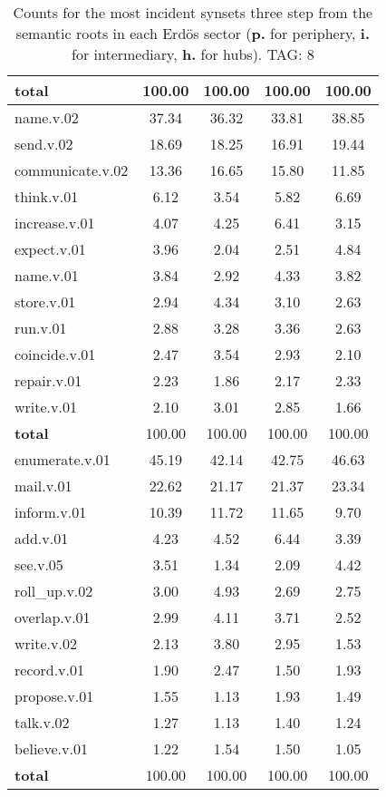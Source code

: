\begin{table}[h!]
\begin{center}
\begin{tabular}{| l || c | c | c | c |}
{{\bf total}} & 100.00  & 100.00  & 100.00  & 100.00 \\\hline\hline\hline
name.v.02 & 37.34  & 36.32  & 33.81  & 38.85 \\\hline
send.v.02 & 18.69  & 18.25  & 16.91  & 19.44 \\\hline
communicate.v.02 & 13.36  & 16.65  & 15.80  & 11.85 \\\hline
think.v.01 & 6.12  & 3.54  & 5.82  & 6.69 \\\hline
increase.v.01 & 4.07  & 4.25  & 6.41  & 3.15 \\\hline
expect.v.01 & 3.96  & 2.04  & 2.51  & 4.84 \\\hline
name.v.01 & 3.84  & 2.92  & 4.33  & 3.82 \\\hline
store.v.01 & 2.94  & 4.34  & 3.10  & 2.63 \\\hline
run.v.01 & 2.88  & 3.28  & 3.36  & 2.63 \\\hline
coincide.v.01 & 2.47  & 3.54  & 2.93  & 2.10 \\\hline
repair.v.01 & 2.23  & 1.86  & 2.17  & 2.33 \\\hline
write.v.01 & 2.10  & 3.01  & 2.85  & 1.66 \\\hline\hline
{{\bf total}} & 100.00  & 100.00  & 100.00  & 100.00 \\\hline\hline\hline
enumerate.v.01 & 45.19  & 42.14  & 42.75  & 46.63 \\\hline
mail.v.01 & 22.62  & 21.17  & 21.37  & 23.34 \\\hline
inform.v.01 & 10.39  & 11.72  & 11.65  & 9.70 \\\hline
add.v.01 & 4.23  & 4.52  & 6.44  & 3.39 \\\hline
see.v.05 & 3.51  & 1.34  & 2.09  & 4.42 \\\hline
roll\_up.v.02 & 3.00  & 4.93  & 2.69  & 2.75 \\\hline
overlap.v.01 & 2.99  & 4.11  & 3.71  & 2.52 \\\hline
write.v.02 & 2.13  & 3.80  & 2.95  & 1.53 \\\hline
record.v.01 & 1.90  & 2.47  & 1.50  & 1.93 \\\hline
propose.v.01 & 1.55  & 1.13  & 1.93  & 1.49 \\\hline
talk.v.02 & 1.27  & 1.13  & 1.40  & 1.24 \\\hline
believe.v.01 & 1.22  & 1.54  & 1.50  & 1.05 \\\hline\hline
{{\bf total}} & 100.00  & 100.00  & 100.00  & 100.00 \\\hline
\end{tabular}
\caption{Counts for the most incident synsets three step from the semantic roots in each Erd\"os sector ({\bf p.} for periphery, {\bf i.} for intermediary, {\bf h.} for hubs). TAG: 8}
\end{center}
\end{table}